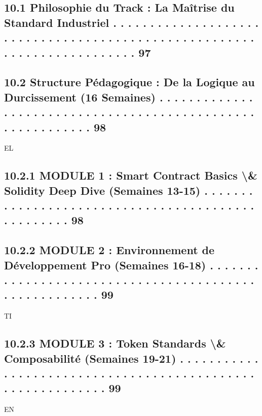 \documentclass[12pt,landscape,a4paper]{article}
\begin{document}
\subsection{10.1    Philosophie du Track : La Maîtrise du Standard Industriel . . . . . . . . . . . . . . . . . . . . . . . . . . . . . . . . . . . . . . . . . . . . . . . . . . . . . . . . . . . . . . . . . . . . . . . . 97}
\subsection{10.2    Structure Pédagogique : De la Logique au Durcissement (16 Semaines) . . . . . . . . . . . . . . . . . . . . . . . . . . . . . . . . . . . . . . . . . . . . . . . . . . . . . . . . . . . 98}
\vspace{0.5em}
\vspace{0.5em}
\vspace{0.5em}
\vspace{0.5em}
EL\\
\subsection{10.2.1              MODULE 1 : Smart Contract Basics \textbackslash{}& Solidity Deep Dive (Semaines 13-15) . . . . . . . . . . . . . . . . . . . . . . . . . . . . . . . . . . . . . . . . . . . . . . . . . . 98}
\subsection{10.2.2              MODULE 2 : Environnement de Développement Pro (Semaines 16-18) . . . . . . . . . . . . . . . . . . . . . . . . . . . . . . . . . . . . . . . . . . . . . . . . . . . . . . 99}
\vspace{0.5em}
\vspace{0.5em}
\vspace{0.5em}
\vspace{0.5em}
TI\\
\subsection{10.2.3              MODULE 3 : Token Standards \textbackslash{}& Composabilité (Semaines 19-21) . . . . . . . . . . . . . . . . . . . . . . . . . . . . . . . . . . . . . . . . . . . . . . . . . . . . . . . . . . . 99}
\vspace{0.5em}
\vspace{0.5em}
\vspace{0.5em}
\vspace{0.5em}
EN\\
\end{document}
